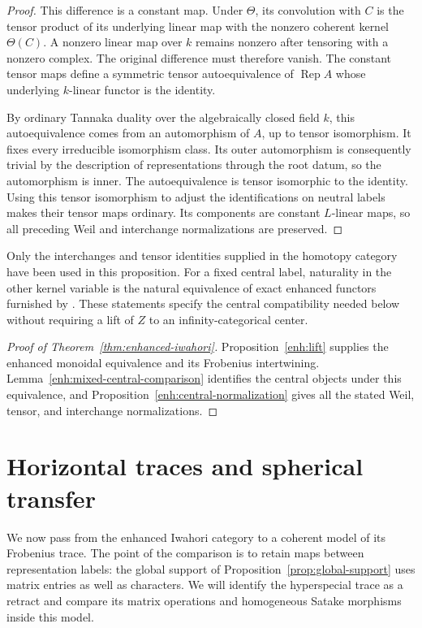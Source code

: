 \documentclass[11pt]{article}
\numberwithin{equation}{section}
\theoremstyle{definition}
\theoremstyle{remark}
\newcommand{\Rep}{\operatorname{Rep}}
\begin{document}
\begin{proof}
This difference is a constant map.  Under $\Theta$, its convolution
with $C$ is the tensor product of its underlying linear map with the
nonzero coherent kernel $\Theta(C)$.  A nonzero linear map over $k$
remains nonzero after tensoring with a nonzero complex.  The original
difference must therefore vanish.  The constant tensor maps define a
symmetric tensor autoequivalence of $\Rep A$ whose underlying
$k$-linear functor is the identity.

By ordinary Tannaka duality over the algebraically closed field $k$,
this autoequivalence comes from an automorphism of $A$, up to tensor
isomorphism.  It fixes every irreducible isomorphism class.  Its outer
automorphism is consequently trivial by the description of
representations through the root datum, so the automorphism is inner.
The autoequivalence is tensor isomorphic to the identity.  Using this
tensor isomorphism to adjust the identifications on neutral labels
makes their tensor maps ordinary.  Its components are constant
$L$-linear maps, so all preceding Weil and interchange normalizations
are preserved.
\end{proof}

Only the interchanges and tensor identities supplied in the homotopy
category have been used in this proposition.  For a fixed central
label, naturality in the other kernel variable is the natural
equivalence of exact enhanced functors furnished by
\cite[Section~2, Theorem ``Central and Wakimoto kernels'']{Parent}.
These statements specify the central compatibility needed below
without requiring a lift of $Z$ to an infinity-categorical center.

\begin{proof}[Proof of Theorem~\ref{thm:enhanced-iwahori}]
Proposition~\ref{enh:lift} supplies the enhanced monoidal equivalence
and its Frobenius intertwining.  Lemma~\ref{enh:mixed-central-comparison}
identifies the central objects under this equivalence, and
Proposition~\ref{enh:central-normalization} gives all the stated Weil,
tensor, and interchange normalizations.
\end{proof}


\section{Horizontal traces and spherical transfer}
\label{sec:trace}

We now pass from the enhanced Iwahori category to a coherent model of
its Frobenius trace.  The point of the comparison is to retain maps
between representation labels: the global support of
Proposition~\ref{prop:global-support} uses matrix entries as well as
characters.  We will identify the hyperspecial trace as a retract and
compare its matrix operations and homogeneous Satake morphisms inside
this model.
\end{document}

